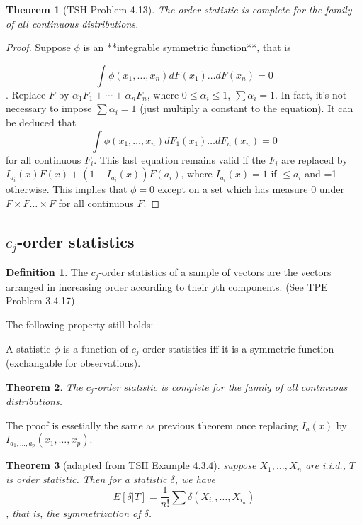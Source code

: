\documentclass[11pt]{article}
\theoremstyle{plain}
\newtheorem{theorem}{\quad\quad Theorem}
\theoremstyle{definition}
\newtheorem{definition}{\quad\quad Definition}
\theoremstyle{remark}
\begin{document}
\begin{theorem}[TSH Problem 4.13]
 The order statistic is complete for the family of all continuous distributions.
\end{theorem}

\begin{proof}
Suppose \(\phi\) is an **integrable symmetric function**, that is

\[\int \phi (x_1,\ldots, x_n) dF(x_1)\ldots dF(x_n)=0\].
Replace \(F\) by \(\alpha_1 F_1+\cdots+\alpha_n F_n\), where \(0\leq \alpha_i\leq 1\), \(\sum \alpha_i =1\).
In fact, it's not necessary to impose \(\sum \alpha_i =1\) (just multiply a constant to the equation).
It can be deduced that \[\int \phi (x_1,\ldots, x_n) dF_1(x_1)\ldots dF_n(x_n)=0\] for all continuous \(F_i\).
This last equation remains valid if the \(F_i\) are replaced by \(I_{a_i}(x) F(x)+(1-I_{a_i}(x)) F(a_i)\), where \(I_{a_i}(x)=1\) if \(\leq a_i\) and =1 otherwise.
This implies that \(\phi=0\) except on a set which has measure 0 under \(F\times F \ldots \times F\) for all continuous \(F\).
\end{proof}


\subsection{\(c_j\)-order statistics}
\begin{definition}
The \(c_j\)-order statistics of a sample of vectors are the vectors arranged in increasing order according to their \(j\)th components. (See TPE Problem 3.4.17)
\end{definition}

The following property still holds:

A statistic \(\phi\) is a function of \(c_j\)-order statistics iff it is a symmetric function (exchangable for observations).


\begin{theorem}
The \(c_j\)-order statistic is complete for the family of all continuous distributions.
\end{theorem}

The proof is essetially the same as previous theorem once replacing \(I_a(x)\) by \(I_{a_1,\ldots,a_p}(x_1,\ldots,x_p)\).

\begin{theorem}[adapted from TSH Example 4.3.4]
    suppose \(X_1,\ldots, X_n\) are i.i.d., \(T\) is order statistic. Then for a statistic \(\delta\), we have 
\[E[\delta| T]=\frac{1}{n!}\sum \delta(X_{i_1},\ldots,X_{i_n}) \],
that is, the symmetrization of \(\delta\).
\end{theorem}
\end{document}
